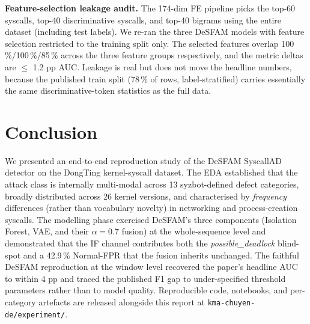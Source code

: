 \documentclass[conference,10pt]{IEEEtran}
\begin{document}
\textbf{Feature-selection leakage audit.} The 174-dim FE pipeline picks
the top-60 syscalls, top-40 discriminative syscalls, and top-40 bigrams
using the entire dataset (including test labels). We re-ran the three
DeSFAM models with feature selection restricted to the training split
only. The selected features overlap 100\,\%/100\,\%/85\,\% across the
three feature groups respectively, and the metric deltas are $\leq$ 1.2 pp
AUC. Leakage is real but does not move the headline numbers, because the
published train split (78\,\% of rows, label-stratified) carries
essentially the same discriminative-token statistics as the full data.

\section{Conclusion}
\label{sec:conclusion}

We presented an end-to-end reproduction study of the DeSFAM
SyscallAD detector on the DongTing kernel-syscall dataset. The EDA
established that the attack class is internally multi-modal across 13
syzbot-defined defect categories, broadly distributed across 26 kernel
versions, and characterised by \emph{frequency} differences (rather than
vocabulary novelty) in networking and process-creation syscalls. The
modelling phase exercised DeSFAM's three components (Isolation Forest,
VAE, and their $\alpha = 0.7$ fusion) at the whole-sequence level and
demonstrated that the IF channel contributes both the
\emph{possible\_deadlock} blind-spot and a 42.9\,\% Normal-FPR that the
fusion inherits unchanged. The faithful DeSFAM reproduction at the
window level recovered the paper's headline AUC to within 4 pp and
traced the published F1 gap to under-specified threshold parameters
rather than to model quality. Reproducible code, notebooks, and
per-category artefacts are released alongside this report at
\texttt{kma-chuyen-de/experiment/}.



\end{document}
